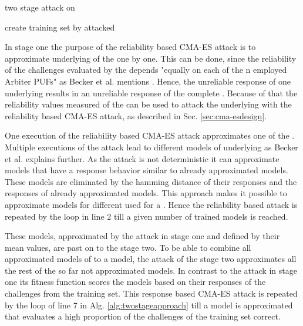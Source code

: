\SetAlCapHSkip{0.2em}
\begin{algorithm}[H] %
\Indm
\SetAlgoLined
\caption{two stage attack on \xpufs}
\label{alg:twostageapproach}
\Indp

create training set by attacked \xpuf\\

\end{algorithm}

In stage one the purpose of the reliability based \ac{CMA-ES} attack is to approximate underlying \apufs of the \xpuf one by one.
This can be done, since the reliability of the challenges evaluated by the \xpuf depends "equally on each of the n employed Arbiter PUFs" as Becker et al. mentions \cite{Becker2015ThePUFs}. %
Hence, the unreliable response of one underlying \apuf results in an unreliable response of the complete \puf.
Because of that the reliability values measured of the \xpuf can be used to attack the underlying \apufs with the reliability based \ac{CMA-ES} attack, as described in Sec. \ref{sec:cma-esdesign}.

One execution of the reliability based \ac{CMA-ES} attack approximates one of the \apufs.
Multiple executions of the attack lead to different models of underlying \apufs as Becker et al. explains further. %
As the attack is not deterministic it can approximate models that have a response behavior similar to already approximated models.
These models are eliminated by the hamming distance of their responses and the responses of already approximated models. %
This approach makes it possible to approximate models for different \apufs used for a \xpuf.
Hence the reliability based attack is repeated by the loop in line 2 till a given number of trained models is reached.

These models, approximated by the attack in stage one and defined by their mean values, are past on to the stage two.
To be able to combine all approximated models of \apuf to a \xpuf model, the attack of the stage two approximates all the rest of the so far not approximated models. %
In contrast to the attack in stage one its fitness function scores the models based on their responses of the challenges from the training set. %
This response based \ac{CMA-ES} attack is repeated by the loop of line 7 in Alg. \ref{alg:twostageapproach} till a model is approximated that evaluates a high proportion of the challenges of the training set correct.

